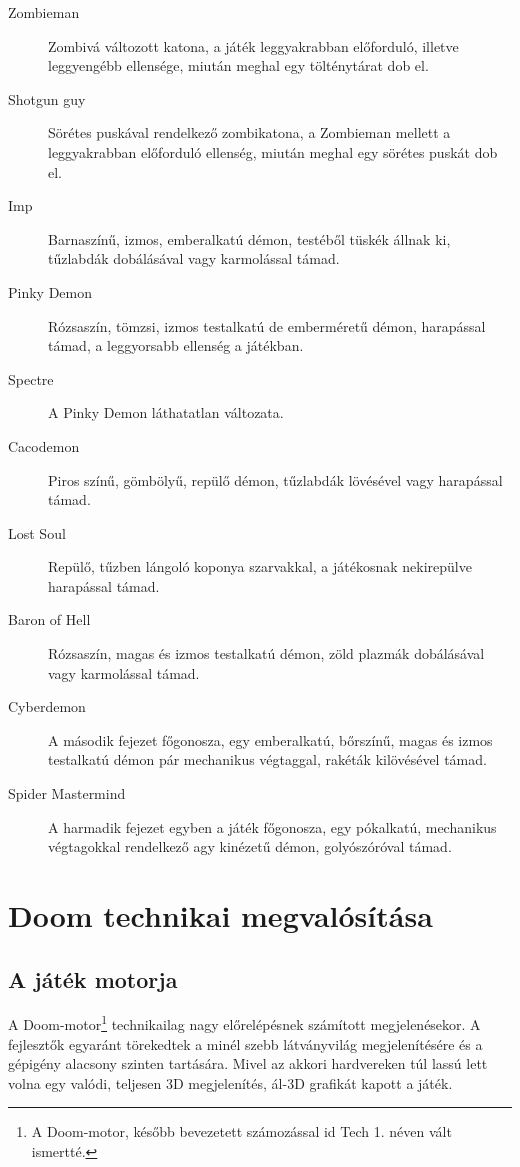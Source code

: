 \documentclass{thesis-ekf}
\theoremstyle{definition}
\begin{document}
\begin{description}
    \item[Zombieman] Zombivá változott katona, a játék leggyakrabban előforduló,
        illetve leggyengébb ellensége, miután meghal egy tölténytárat dob el.
    \item[Shotgun guy] Sörétes puskával rendelkező zombikatona, a Zombieman
        mellett a leggyakrabban előforduló ellenség, miután meghal egy sörétes
        puskát dob el.
    \item[Imp] Barnaszínű, izmos, emberalkatú démon, testéből tüskék állnak ki,
        tűzlabdák dobálásával vagy karmolással támad.
    \item[Pinky Demon] Rózsaszín, tömzsi, izmos testalkatú de emberméretű démon,
        harapással támad, a leggyorsabb ellenség a játékban.
    \item[Spectre] A Pinky Demon láthatatlan változata.
    \item[Cacodemon] Piros színű, gömbölyű, repülő démon, tűzlabdák lövésével
        vagy harapással támad.
    \item[Lost Soul] Repülő, tűzben lángoló koponya szarvakkal, a játékosnak
        nekirepülve harapással támad.
    \item[Baron of Hell] Rózsaszín, magas és izmos testalkatú démon, zöld
        plazmák dobálásával vagy karmolással támad.
    \item[Cyberdemon] A második fejezet főgonosza, egy emberalkatú, bőrszínű,
        magas és izmos testalkatú démon pár mechanikus végtaggal, rakéták
        kilövésével támad.
    \item[Spider Mastermind] A harmadik fejezet egyben a játék főgonosza, egy
        pókalkatú, mechanikus végtagokkal rendelkező agy kinézetű démon,
        golyószóróval támad.
\end{description}
\cite[Ellenségek]{doomgame}

\chapter{Doom technikai megvalósítása}
\label{chap:engine}

\section{A játék motorja}

A Doom-motor\footnote{A Doom-motor, később bevezetett számozással id Tech 1.
néven vált ismertté.} technikailag nagy előrelépésnek számított megjelenésekor.
A fejlesztők egyaránt törekedtek a minél szebb látványvilág megjelenítésére és a
gépigény alacsony szinten tartására. Mivel az akkori hardvereken túl lassú lett
volna egy valódi, teljesen 3D megjelenítés, ál-3D grafikát kapott a játék.
\cite[A játék motorja]{doomgame}
\end{document}
